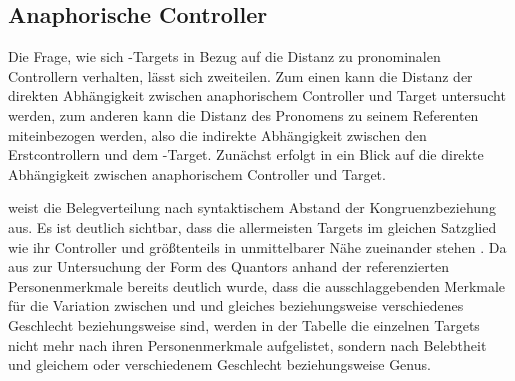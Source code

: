 \subsection{Anaphorische Controller}
\label{subsec:caodistanactrl}

Die Frage, wie sich -Targets in Bezug auf die Distanz zu
pronominalen Controllern verhalten, lässt sich zweiteilen. Zum einen kann die
Distanz der direkten Abhängigkeit zwischen anaphorischem Controller und Target
untersucht werden, zum anderen kann die Distanz des
Pronomens zu seinem Referenten miteinbezogen werden, also die indirekte
Abhängigkeit zwischen den Erstcontrollern und dem
-Target. Zunächst erfolgt in  ein Blick auf
die direkte Abhängigkeit zwischen anaphorischem Controller und Target.

 weist die Belegverteilung nach syntaktischem
Abstand der Kongruenzbeziehung
aus. Es ist deutlich sichtbar, dass die allermeisten Targets im gleichen
Satzglied wie ihr Controller und größtenteils in unmittelbarer Nähe zueinander
stehen \autocite[vgl.][526--527]{ksw2}. Da aus  zur
Untersuchung der Form des Quantors  anhand der referenzierten
Personenmerkmale bereits deutlich wurde, dass die
ausschlaggebenden Merkmale für die Variation zwischen  und
  und gleiches beziehungsweise verschiedenes
Geschlecht beziehungsweise  sind, werden in der Tabelle
die einzelnen Targets nicht mehr nach ihren Personenmerkmale aufgelistet,
sondern nach Belebtheit und gleichem oder verschiedenem Geschlecht
beziehungsweise Genus.

